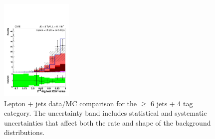 \begin{figure}[hbtp]
\begin{center}
   \includegraphics[width=0.31\textwidth]{Figures/Analysis_1_Diagrams/d2MCPlots_second_highest_btag_cut9_jge6_tge4_Combined_HtWgt.pdf}
   \hspace{0.055\textwidth}
   \caption{Lepton + jets data/MC comparison for the $\ge$ 6 jets + 4 tag category.  The uncertainty band includes statistical and systematic uncertainties that affect both the rate and shape of the background distributions.}
   \label{fig:lj_input_6j_4t_part1}
 \end{center}
\end{figure}

\clearpage

